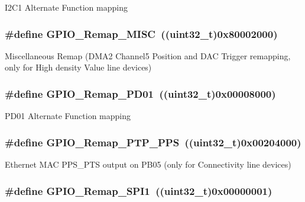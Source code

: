 \label{group__GPIO__Remap__define_ga6cf601e6db62cb2e9dbbccb276401b18}
I2C1 Alternate Function mapping \hypertarget{group__GPIO__Remap__define_ga543f3626303b3452528cb622ad088d26}{
\subsubsection[{GPIO\_\-Remap\_\-MISC}]{\setlength{\rightskip}{0pt plus 5cm}\#define GPIO\_\-Remap\_\-MISC~((uint32\_\-t)0x80002000)}}
\label{group__GPIO__Remap__define_ga543f3626303b3452528cb622ad088d26}
Miscellaneous Remap (DMA2 Channel5 Position and DAC Trigger remapping, only for High density Value line devices) \hypertarget{group__GPIO__Remap__define_gaeac44191de99d55a5fa03e29b74d5e59}{
\subsubsection[{GPIO\_\-Remap\_\-PD01}]{\setlength{\rightskip}{0pt plus 5cm}\#define GPIO\_\-Remap\_\-PD01~((uint32\_\-t)0x00008000)}}
\label{group__GPIO__Remap__define_gaeac44191de99d55a5fa03e29b74d5e59}
PD01 Alternate Function mapping \hypertarget{group__GPIO__Remap__define_ga3e9d7808d1e50393afde08e4a45d18aa}{
\subsubsection[{GPIO\_\-Remap\_\-PTP\_\-PPS}]{\setlength{\rightskip}{0pt plus 5cm}\#define GPIO\_\-Remap\_\-PTP\_\-PPS~((uint32\_\-t)0x00204000)}}
\label{group__GPIO__Remap__define_ga3e9d7808d1e50393afde08e4a45d18aa}
Ethernet MAC PPS\_\-PTS output on PB05 (only for Connectivity line devices) \hypertarget{group__GPIO__Remap__define_ga58b02a04a6041954c6e99e681716ab4c}{
\subsubsection[{GPIO\_\-Remap\_\-SPI1}]{\setlength{\rightskip}{0pt plus 5cm}\#define GPIO\_\-Remap\_\-SPI1~((uint32\_\-t)0x00000001)}}
